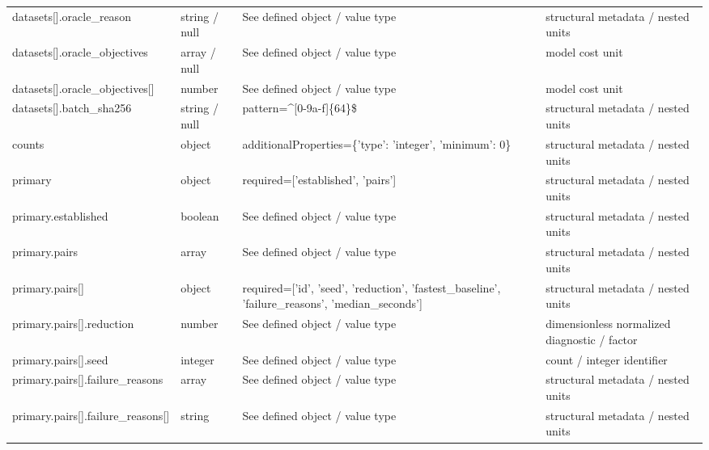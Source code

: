 \begin{longtable}{@{}>{\raggedright\arraybackslash}p{}>{\raggedright\arraybackslash}p{}>{\raggedright\arraybackslash}p{}>{\raggedright\arraybackslash}p{}@{}}
datasets[].\allowbreak{}oracle\_\allowbreak{}reason & string /\allowbreak{} null & See defined object /\allowbreak{} value type & structural metadata /\allowbreak{} nested units\\
datasets[].\allowbreak{}oracle\_\allowbreak{}objectives & array /\allowbreak{} null & See defined object /\allowbreak{} value type & model cost unit\\
datasets[].\allowbreak{}oracle\_\allowbreak{}objectives[] & number & See defined object /\allowbreak{} value type & model cost unit\\
datasets[].\allowbreak{}batch\_\allowbreak{}sha256 & string /\allowbreak{} null & pattern=\allowbreak{}\textasciicircum{}[0-9a-\allowbreak{}f]\{64\}\$ & structural metadata /\allowbreak{} nested units\\
counts & object & additionalProperties=\allowbreak{}\{'type': 'integer', 'minimum': 0\} & structural metadata /\allowbreak{} nested units\\
primary & object & required=\allowbreak{}['established', 'pairs'] & structural metadata /\allowbreak{} nested units\\
primary.\allowbreak{}established & boolean & See defined object /\allowbreak{} value type & structural metadata /\allowbreak{} nested units\\
primary.\allowbreak{}pairs & array & See defined object /\allowbreak{} value type & structural metadata /\allowbreak{} nested units\\
primary.\allowbreak{}pairs[] & object & required=\allowbreak{}['id', 'seed', 'reduction', 'fastest\_\allowbreak{}baseline', 'failure\_\allowbreak{}reasons', 'median\_\allowbreak{}seconds'] & structural metadata /\allowbreak{} nested units\\
primary.\allowbreak{}pairs[].\allowbreak{}reduction & number & See defined object /\allowbreak{} value type & dimensionless normalized diagnostic /\allowbreak{} factor\\
primary.\allowbreak{}pairs[].\allowbreak{}seed & integer & See defined object /\allowbreak{} value type & count /\allowbreak{} integer identifier\\
primary.\allowbreak{}pairs[].\allowbreak{}failure\_\allowbreak{}reasons & array & See defined object /\allowbreak{} value type & structural metadata /\allowbreak{} nested units\\
primary.\allowbreak{}pairs[].\allowbreak{}failure\_\allowbreak{}reasons[] & string & See defined object /\allowbreak{} value type & structural metadata /\allowbreak{} nested units\\

\end{longtable}
